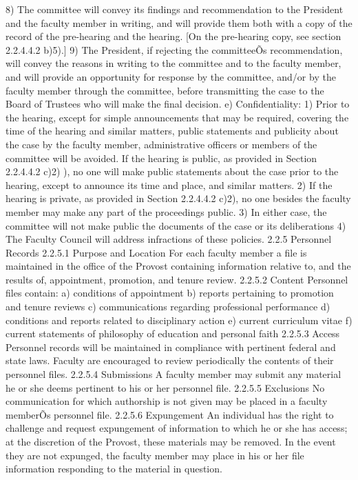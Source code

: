 \documentclass[letterpaper, 11pt]{article}
\begin{document}
	8) The committee will convey its findings and recommendation to the President and the faculty member in writing, and will provide them both with a copy of the record of the pre-hearing and the hearing.  [On the pre-hearing copy, see section 2.2.4.4.2 b)5).]
	9) The President, if rejecting the committeeÕs recommendation, will convey the reasons in writing to the committee and to the faculty member, and will provide an opportunity for response by the committee, and/or by the faculty member through the committee, before transmitting the case to the Board of Trustees who will make the final decision.
	e) Confidentiality:
	1) Prior to the hearing, except for simple announcements that may be required, covering the time of the hearing and similar matters, public statements and publicity about the case by the faculty member, administrative officers or members of the committee will be avoided.  If the hearing is public, as provided in Section 2.2.4.4.2 c)2) ), no one will make public statements about the case prior to the hearing, except to announce its time and place, and similar matters.
	2) If the hearing is private, as provided in Section 2.2.4.4.2 c)2), no one besides the faculty member may make any part of the proceedings public.
	3) In either case, the committee will not make public the documents of the case or its deliberations
	4) The Faculty Council will address infractions of these policies.
	2.2.5 Personnel Records
	2.2.5.1 Purpose and Location
	For each faculty member a file is maintained in the office of the Provost containing information relative to, and the results of, appointment, promotion, and tenure review.
	2.2.5.2 Content
	Personnel files contain:
	a) conditions of appointment
	b) reports pertaining to promotion and tenure reviews
	c) communications regarding professional performance
	d) conditions and reports related to disciplinary action
	e) current curriculum vitae
	f) current statements of philosophy of education and personal faith
	2.2.5.3 Access
	Personnel records will be maintained in compliance with pertinent federal and state laws.  Faculty are encouraged to review periodically the contents of their personnel files.
	2.2.5.4 Submissions
	A faculty member may submit any material he or she deems pertinent to his or her personnel file.
	2.2.5.5 Exclusions
	No communication for which authorship is not given may be placed in a faculty memberÕs personnel file.
	2.2.5.6 Expungement
	An individual has the right to challenge and request expungement of information to which he or she has access; at the discretion of the Provost, these materials may be removed.  In the event they are not expunged, the faculty member may place in his or her file information responding to the material in question.
\end{document}
